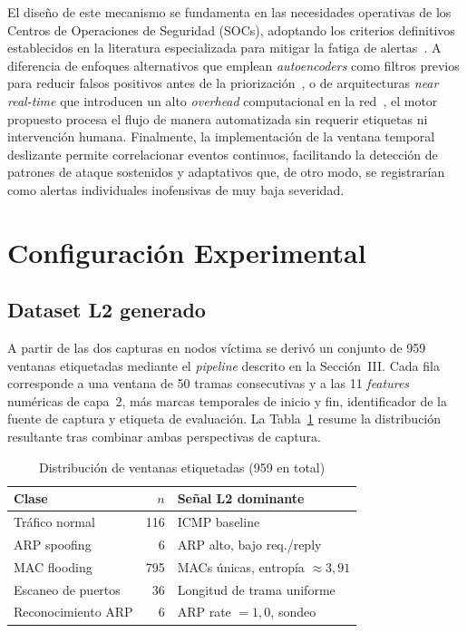 \documentclass[conference]{IEEEtran}
\begin{document}
El diseño de este mecanismo se fundamenta en las necesidades operativas
de los Centros de Operaciones de Seguridad (SOCs), adoptando los
criterios definitivos establecidos en la literatura especializada para
mitigar la fatiga de alertas~\cite{tariq2025,jalalvand2024}. A
diferencia de enfoques alternativos que emplean \textit{autoencoders}
como filtros previos para reducir falsos positivos antes de la
priorización~\cite{aminanto2020}, o de arquitecturas
\textit{near real-time} que introducen un alto \textit{overhead}
computacional en la red~\cite{carrera2022}, el motor propuesto procesa
el flujo de manera automatizada sin requerir etiquetas ni intervención
humana. Finalmente, la implementación de la ventana temporal deslizante
permite correlacionar eventos continuos, facilitando la detección de
patrones de ataque sostenidos y adaptativos que, de otro modo, se
registrarían como alertas individuales inofensivas de muy baja
severidad.

\section{Configuración Experimental}

\subsection{Dataset L2 generado}
A partir de las dos capturas en nodos víctima se derivó un conjunto de
959 ventanas etiquetadas mediante el \textit{pipeline} descrito en la
Sección~III. Cada fila corresponde a
una ventana de 50 tramas consecutivas y a las 11 \textit{features}
numéricas de capa~2, más marcas temporales de inicio y fin, identificador
de la fuente de captura y etiqueta de evaluación. La Tabla~\ref{tab:distribucion_labels} resume la
distribución resultante tras combinar ambas perspectivas de captura.

\begin{table}[htbp]
\caption{Distribución de ventanas etiquetadas (959 en total)}
\label{tab:distribucion_labels}
\centering
\footnotesize
\renewcommand{\arraystretch}{1.1}
\setlength{\tabcolsep}{4pt}
\begin{tabular}{@{}l r >{\raggedright\arraybackslash}p{}@{}}
\hline
\textbf{Clase} & \textbf{$n$} & \textbf{Señal L2 dominante} \\
\hline
Tráfico normal & 116 & ICMP baseline \\
ARP spoofing & 6 & ARP alto, bajo req./reply \\
MAC flooding & 795 & 50 MACs únicas, entropía $\approx 3{,}91$ \\
Escaneo de puertos & 36 & Longitud de trama uniforme \\
Reconocimiento ARP & 6 & ARP rate $=1{,}0$, sondeo \\
\hline
\end{tabular}
\end{table}
\end{document}
